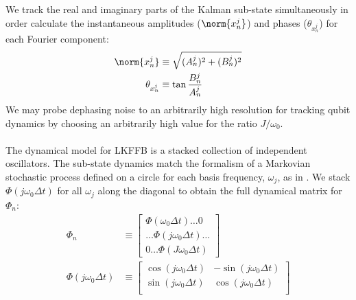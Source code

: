 We track the real and imaginary parts of the Kalman sub-state  simultaneously in order calculate the instantaneous amplitudes ($\norm{x^j_n}$) and phases ($\theta_{x^j_n}$)  for each Fourier component:
\begin{align}
\norm{x^j_n} & \equiv \sqrt{(A^j_{n})^2 + (B^j_{n})^2} \\
\theta_{x^j_n} & \equiv \tan{\frac{B^j_{n}}{A^j_{n}}}
\end{align}
We may probe dephasing noise to an arbitrarily high resolution for tracking qubit dynamics by choosing an arbitrarily high value for the ratio $J/\omega_0$.
\\
\\
The dynamical model for LKFFB is a stacked collection of independent oscillators. The sub-state dynamics match the formalism of a Markovian stochastic process defined on a circle for each basis frequency, $\omega_j$, as in \cite{karlin2012}. We stack $\Phi(j \omega_0 \Delta t) $ for all $\omega_j$ along the diagonal to obtain the full dynamical matrix for $\Phi_n$:
\begin{align}
\Phi_{n} & \equiv \begin{bmatrix} 
\Phi(\omega_0 \Delta t)\hdots 0  \\ 
 \hdots \Phi(j\omega_0 \Delta t) \hdots \\
0 \hdots \Phi(J \omega_0 \Delta t)  \end{bmatrix}\\ 
\Phi(j \omega_0 \Delta t) &\equiv \begin{bmatrix} \cos(j \omega_0 \Delta t) & -\sin(j \omega_0 \Delta t) \\ \sin(j \omega_0 \Delta t) & \cos(j \omega_0 \Delta t) \\ \end{bmatrix} \label{eqn:ap_approxSP:LKFFB_Phi} 
\end{align}
